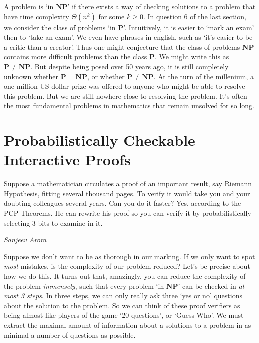 \documentclass[answers]{exam}
\begin{document}
A problem is `in $\mathbf{NP}$' if there exists a way of checking solutions to a problem that have time complexity $\Theta(n^k)$ for some $k \geq 0$. In question 6 of the last section, we consider the class of problems `in $\mathbf{P}$'. Intuitively, it is easier to `mark an exam' then to `take an exam'. We even have phrases in english, such as `it's easier to be a critic than a creator'. Thus one might conjecture that the class of problems $\mathbf{NP}$ contains more difficult problems than the class $\mathbf{P}$. We might write this as $\mathbf{P} \neq \mathbf{NP}$. But despite being posed over 50 years ago, it is still completely unknown whether $\mathbf{P} = \mathbf{NP}$, or whether $\mathbf{P} \neq \mathbf{NP}$. At the turn of the millenium, a one million US dollar prize was offered to anyone who might be able to resolve this problem. But we are still nowhere close to resolving the problem. It's often the most fundamental problems in mathematics that remain unsolved for so long.

\section{Probabilistically Checkable Interactive Proofs}

\epigraph{Suppose a mathematician circulates a proof of an important result, say Riemann Hypothesis, fitting several thousand pages. To verify it would take you and
your doubting colleagues several years. Can you do it faster? Yes, according to the
PCP Theorems. He can rewrite his proof so you can verify it by probabilistically
selecting 3 bits to examine in it.}{\textit{Sanjeev Arora}}

Suppose we don't want to be as thorough in our marking. If we only want to spot \emph{most} mistakes, is the complexity of our problem reduced? Let's be precise about how we do this. It turns out that, amazingly, you can reduce the complexity of the problem \emph{immensely}, such that every problem `in $\mathbf{NP}$' can be checked in \emph{at most 3 steps}. In three steps, we can only really ask three `yes or no' questions about the solution to the problem. So we can think of these proof verifiers as being almost like players of the game `20 questions', or `Guess Who'. We must extract the maximal amount of information about a solutions to a problem in as minimal a number of questions as possible.
\end{document}
